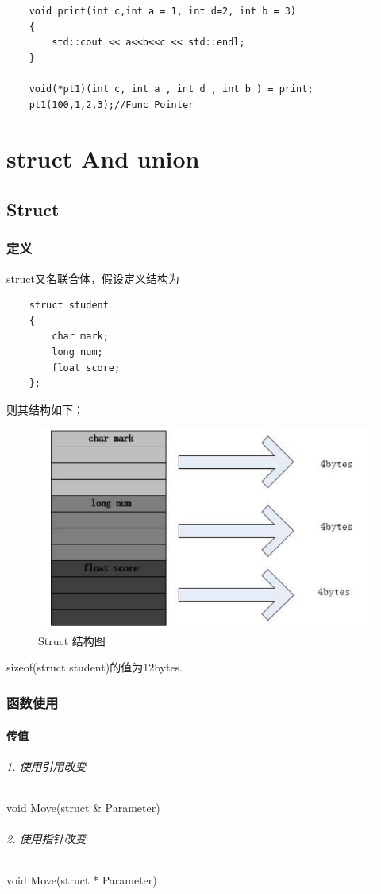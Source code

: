 \documentclass[UTF8,a4paper,12pt]{ctexbook} %
\begin{document}
			 \begin{lstlisting}
	void print(int c,int a = 1, int d=2, int b = 3)
	{
		std::cout << a<<b<<c << std::endl;
	}
	
	void(*pt1)(int c, int a , int d , int b ) = print;
	pt1(100,1,2,3);//Func Pointer			 	
			 \end{lstlisting}
        
\chapter{struct And union}
	\section{Struct} 
		\subsection{定义}
			struct又名联合体，假设定义结构为
			\begin{lstlisting}
	struct student
	{
		char mark;
		long num;
		float score;
	};			
			\end{lstlisting}
			
			则其结构如下：
			\begin{figure}[H]
				\centering
				\includegraphics[width = 12cm]{struct.png}
				\caption{Struct 结构图}
			\end{figure} 
			
			sizeof(struct student)的值为12bytes.
		
		\subsection{函数使用}
			\subsubsection{传值}
		         \subparagraph{1. 使用引用改变}void Move(struct \& Parameter)
		         \subparagraph{2. 使用指针改变}void Move(struct * Parameter)
		         
\end{document}
